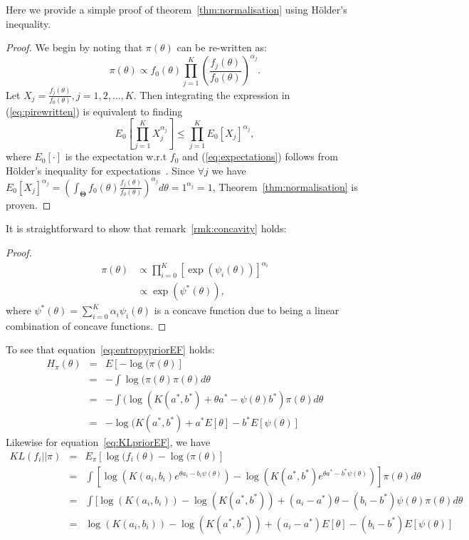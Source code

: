 \documentclass[a4paper, notitlepage, 10pt]{article}
\begin{document}
Here we provide a simple proof of theorem~\ref{thm:normalisation} using H\"{o}lder's inequality.
\begin{proof}
We begin by noting that $\pi(\theta)$ can be re-written as:
\begin{equation}
\label{eq:pirewritten}
 \pi(\theta) \propto f_0(\theta)\prod_{j=1}^{K} \left(\frac{f_j(\theta)}{f_0(\theta)}\right)^{\alpha_j}.
\end{equation}
Let $X_j = \frac{f_j(\theta)}{f_0(\theta)}, j=1, 2,\ldots, K$. 
Then integrating the expression in (\ref{eq:pirewritten}) is equivalent to finding 
\begin{equation}
\label{eq:expectations}
E_{0}\left[\prod_{j=1}^KX_j^{\alpha_j}\right] \leq \prod_{j=1}^KE_{0}[X_j]^{\alpha_j},
\end{equation}
where $E_{0}[\cdot]$ is the expectation w.r.t $f_0$ and (\ref{eq:expectations}) follows from H\"{o}lder's inequality for expectations~\citep{yeh2011}.
Since $\forall j$ we have $E_{0}[X_j]^{\alpha_j} = \left(\int_{\boldsymbol\Theta}f_0(\theta)\frac{f_j(\theta)}{f_0(\theta)}\right)^{\alpha_j}d\theta=1^{\alpha_j}=1$, Theorem~\ref{thm:normalisation} is proven.
\end{proof}
It is straightforward to show that remark~\ref{rmk:concavity} holds:
\begin{proof}
\begin{align}
 \pi(\theta) &\propto \prod_{i=0}^{K} [\exp(\psi_i(\theta))]^{\alpha_i}\\
             &\propto \exp(\psi^{\ast}(\theta)),
\end{align}
 where $\psi^{\ast}(\theta) = \sum_{i=0}^{K}\alpha_i\psi_i(\theta)$ is a concave function due to being a linear combination of concave functions.
\end{proof}
To see that equation~\ref{eq:entropypriorEF} holds:
\begin{eqnarray*} 
H_\pi(\theta) & = & E[-\log(\pi(\theta)] \\
              & = & - \int \log(\pi(\theta) \pi(\theta) d\theta \\
              & = & - \int (\log(K(a^*, b^*) + \theta a^* - \psi(\theta) b^*) \pi(\theta) d\theta \\
              & = & - \log(K(a^*, b^*) + a^*  E[\theta]-  b^*  E[\psi(\theta)]
\end{eqnarray*}
Likewise for equation~\ref{eq:KLpriorEF}, we have 
\begin{eqnarray*} 
KL(f_i || \pi) & = & E_\pi[\log(f_i(\theta)-\log(\pi(\theta)] \\
              & = & \int [\log( K(a_i,b_i) e^{\theta a_i - b_i \psi(\theta)}) - \log(K(a^*,b^*) e^{\theta a^* - b^* \psi(\theta)}) ] \pi(\theta) d\theta \\
              & = & \int [\log( K(a_i,b_i)) - \log(K(a^*,b^*)) + (a_i - a^*) \theta  - (b_i - b^*) \psi(\theta) \pi(\theta) d\theta \\
              & = & \log( K(a_i,b_i)) - \log(K(a^*,b^*)) + (a_i - a^*) E[\theta] - (b_i - b^*) E[\psi(\theta)] 
\end{eqnarray*}
\end{document}
